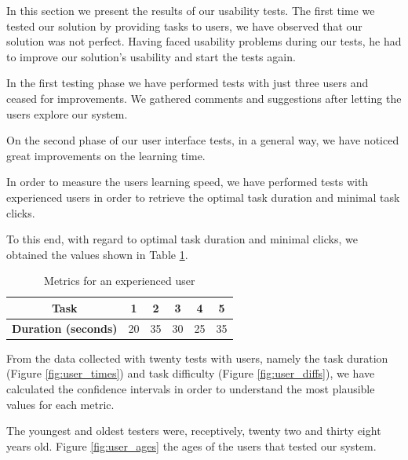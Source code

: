 \documentclass[10pt,conference]{IEEEtran}
\begin{document}
In this section we present the results of our usability tests. The first time we tested our solution by providing tasks to users, we have observed that our solution was not perfect. Having faced usability problems during our tests, he had to improve our solution's usability and start the tests again.


In the first testing phase we have performed tests with just three users and ceased for improvements. We gathered comments and suggestions after letting the users explore our system.

On the second phase of our user interface tests, in a general way, we have noticed great improvements on the learning time.

In order to measure the users learning speed, we have performed tests with experienced users in order to retrieve the optimal task duration and minimal task clicks.

To this end, with regard to optimal task duration and minimal clicks, we obtained the values shown in Table \ref{table:optimal}.


\begin{table}[H]
\centering
\caption{Metrics for an experienced user}
\label{table:optimal}
\begin{tabular}{|c|c|c|c|c|c|}
\hline
\textbf{Task} & 1 & 2 & 3 & 4 & 5 \\ \hline
\textbf{Duration (seconds)} & 20 & 35 & 30 & 25 & 35 \\ \hline
\end{tabular}
\end{table}


From the data collected with twenty tests with users, namely the task duration (Figure \ref{fig:user_times}) and task difficulty (Figure \ref{fig:user_diffs}), we have calculated the confidence intervals in order to understand the most plausible values for each metric.

The youngest and oldest testers were, receptively, twenty two and thirty eight years old. Figure \ref{fig:user_ages} the ages of the users that tested our system.
\end{document}
